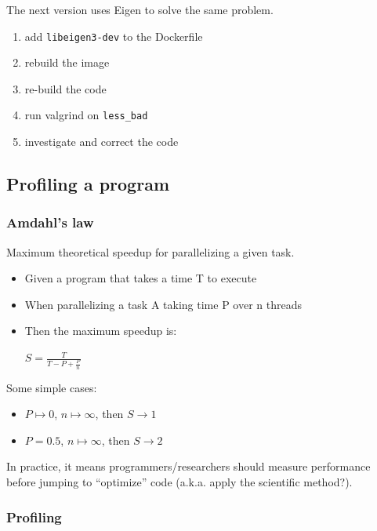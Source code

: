 The next version uses Eigen to solve the same problem.

\begin{enumerate}
\def\labelenumi{\arabic{enumi}.}
\itemsep1pt\parskip0pt
\item
  add \texttt{libeigen3-dev} to the Dockerfile
\item
  rebuild the image
\item
  re-build the code
\item
  run valgrind on \texttt{less\_bad}
\item
  investigate and correct the code
\end{enumerate}

\subsection{Profiling a program}\label{profiling-a-program}

\subsubsection{Amdahl's law}\label{amdahls-law-1}

Maximum theoretical speedup for parallelizing a given task.

\begin{itemize}
\item
  Given a program that takes a time T to execute
\item
  When parallelizing a task A taking time P over n threads
\item
  Then the maximum speedup is:

  $S = \frac{T}{T - P + \frac{P}{n}}$
\end{itemize}

Some simple cases:

\begin{itemize}
\itemsep1pt\parskip0pt
\item
  $P \mapsto 0$, $n \mapsto \infty$, then $S \rightarrow 1$
\item
  $P=0.5$, $n \mapsto \infty$, then $S \rightarrow 2$
\end{itemize}

In practice, it means programmers/researchers should measure performance
before jumping to ``optimize'' code (a.k.a. apply the scientific
method?).

\subsubsection{Profiling}\label{profiling}

